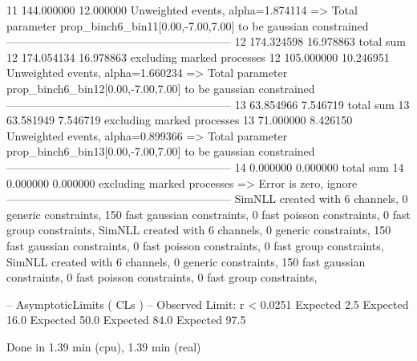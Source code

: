 11         144.000000      12.000000       Unweighted events, alpha=1.874114
  => Total parameter prop_binch6_bin11[0.00,-7.00,7.00] to be gaussian constrained
------------------------------------------------------------
12         174.324598      16.978863       total sum                     
12         174.054134      16.978863       excluding marked processes    
12         105.000000      10.246951       Unweighted events, alpha=1.660234
  => Total parameter prop_binch6_bin12[0.00,-7.00,7.00] to be gaussian constrained
------------------------------------------------------------
13         63.854966       7.546719        total sum                     
13         63.581949       7.546719        excluding marked processes    
13         71.000000       8.426150        Unweighted events, alpha=0.899366
  => Total parameter prop_binch6_bin13[0.00,-7.00,7.00] to be gaussian constrained
------------------------------------------------------------
14         0.000000        0.000000        total sum                     
14         0.000000        0.000000        excluding marked processes    
  => Error is zero, ignore      
------------------------------------------------------------
SimNLL created with 6 channels, 0 generic constraints, 150 fast gaussian constraints, 0 fast poisson constraints, 0 fast group constraints, 
SimNLL created with 6 channels, 0 generic constraints, 150 fast gaussian constraints, 0 fast poisson constraints, 0 fast group constraints, 
SimNLL created with 6 channels, 0 generic constraints, 150 fast gaussian constraints, 0 fast poisson constraints, 0 fast group constraints, 

 -- AsymptoticLimits ( CLs ) --
Observed Limit: r < 0.0251
Expected  2.5%
Expected 16.0%
Expected 50.0%
Expected 84.0%
Expected 97.5%

Done in 1.39 min (cpu), 1.39 min (real)
